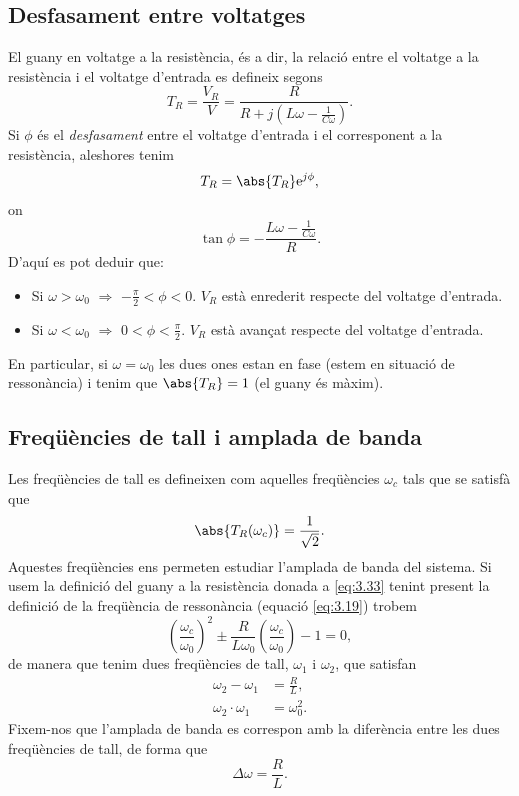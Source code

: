 \documentclass[a4paper,10.5pt]{report}
\begin{document}
\subsection{Desfasament entre voltatges}
El guany en voltatge a la resistència, és a dir, la relació entre el voltatge a la resistència i el voltatge d'entrada es defineix segons
\begin{equation}
	T_R = \frac{V_R}{V} = \frac{R}{R+j(L\omega - \frac{1}{C\omega})} \label{eq:3.33}.
\end{equation}
Si $\phi$ és el \textit{desfasament} entre el voltatge d'entrada i el corresponent a la resistència, aleshores tenim
\begin{equation}
	T_R = \abs{T_R}\mathrm{e}^{j \phi},
\end{equation}
on
\begin{equation}
	\tan \phi = -\frac{L\omega - \frac{1}{C\omega}}{R}.
\end{equation}
D'aquí es pot deduir que:
\begin{itemize}
	\item Si $\omega > \omega_0$ $\Rightarrow$ $-\frac{\pi}{2}<\phi<0$. $V_R$ està enrederit respecte del voltatge d'entrada.
 	\item Si $\omega < \omega_0$ $\Rightarrow$ $0<\phi<\frac{\pi}{2}$. $V_R$ està avançat respecte del voltatge d'entrada.
\end{itemize}
En particular, si $\omega = \omega_0$ les dues ones estan en fase (estem en situació de ressonància) i tenim que $\abs{T_R} = 1$ (el guany és màxim).

\subsection{Freqüències de tall i amplada de banda}
Les freqüències de tall es defineixen com aquelles freqüències $\omega_c$ tals que se satisfà que
\begin{equation}
	\abs{T_R(\omega_c)} = \frac{1}{\sqrt{2}}.
\end{equation}
Aquestes freqüències ens permeten estudiar l'amplada de banda del sistema. Si usem la definició del guany a la resistència donada a \eqref{eq:3.33} tenint present la definició de la freqüència de ressonància (equació \eqref{eq:3.19}) trobem
\begin{equation}
	\left(\frac{\omega_c}{\omega_0}\right)^2 \pm \frac{R}{L\omega_0}\left(\frac{\omega_c}{\omega_0}\right) -1=0,
\end{equation}
de manera que tenim dues freqüències de tall, $\omega_1$ i $\omega_2$, que satisfan 
\begin{align}
	\omega_2-\omega_1 & = \frac{R}{L}, \label{eq:3.38} \\
	\omega_2 \cdot \omega_1 & = \omega_0^2 \label{eq:3.39}.
\end{align}
Fixem-nos que l'amplada de banda es correspon amb la diferència entre les dues freqüències de tall, de forma que
\begin{equation}
	\Delta \omega = \frac{R}{L}. \label{eq:3.40}
\end{equation}
\end{document}
